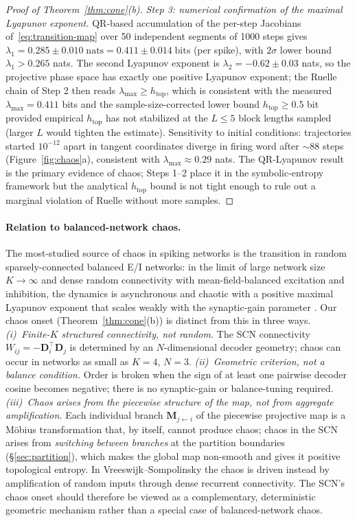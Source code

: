 \documentclass[12pt]{article}
\newcommand{\vv}[1]{\mathbf{#1}}
\newcommand{\DD}{\vv{D}}
\begin{document}
\begin{proof}[Proof of Theorem~\ref{thm:cone}(b)]
\emph{Step 3: numerical confirmation of the maximal Lyapunov exponent.} QR-based accumulation of the per-step Jacobians of~\eqref{eq:transition-map} over 50 independent segments of 1000 steps gives $\lambda_1=0.285\pm 0.010\;\text{nats}=0.411\pm 0.014\;\text{bits}$ (per spike), with $2\sigma$ lower bound $\lambda_1>0.265$ nats. The second Lyapunov exponent is $\lambda_2=-0.62\pm 0.03$ nats, so the projective phase space has exactly one positive Lyapunov exponent; the Ruelle chain of Step 2 then reads $\lambda_{\max}\geq h_{\text{top}}$, which is consistent with the measured $\lambda_{\max}=0.411$ bits and the sample-size-corrected lower bound $h_{\text{top}}\geq 0.5$ bit provided empirical $h_{\text{top}}$ has not stabilized at the $L\leq 5$ block lengths sampled (larger $L$ would tighten the estimate). Sensitivity to initial conditions: trajectories started $10^{-12}$ apart in tangent coordinates diverge in firing word after ${\sim}88$ steps (Figure~\ref{fig:chaos}a), consistent with $\lambda_{\max}\approx 0.29$ nats. The QR-Lyapunov result is the primary evidence of chaos; Steps 1--2 place it in the symbolic-entropy framework but the analytical $h_{\text{top}}$ bound is not tight enough to rule out a marginal violation of Ruelle without more samples.
\end{proof}
\paragraph{Relation to balanced-network chaos.}
The most-studied source of chaos in spiking networks is the \citet{vreeswijk1996chaos} transition in random sparsely-connected balanced E/I networks: in the limit of large network size $K\to\infty$ and dense random connectivity with mean-field-balanced excitation and inhibition, the dynamics is asynchronous and chaotic with a positive maximal Lyapunov exponent that scales weakly with the synaptic-gain parameter \citep[see also][]{monteforte2010dynamical,engelken2023lyapunov}. Our chaos onset (Theorem~\ref{thm:cone}(b)) is distinct from this in three ways. \emph{(i)~Finite-$K$ structured connectivity, not random.} The SCN connectivity $W_{ij}=-\DD_i^\top\DD_j$ is determined by an $N$-dimensional decoder geometry; chaos can occur in networks as small as $K=4$, $N=3$. \emph{(ii)~Geometric criterion, not a balance condition.} Order is broken when the sign of at least one pairwise decoder cosine becomes negative; there is no synaptic-gain or balance-tuning required. \emph{(iii)~Chaos arises from the piecewise structure of the map, not from aggregate amplification.} Each individual branch $\vv{M}_{j\leftarrow i}$ of the piecewise projective map is a M\"obius transformation that, by itself, cannot produce chaos; chaos in the SCN arises from \emph{switching between branches} at the partition boundaries (\S\ref{sec:partition}), which makes the global map non-smooth and gives it positive topological entropy. In Vreeswijk--Sompolinsky the chaos is driven instead by amplification of random inputs through dense recurrent connectivity. The SCN's chaos onset should therefore be viewed as a complementary, deterministic geometric mechanism rather than a special case of balanced-network chaos.
\end{document}
